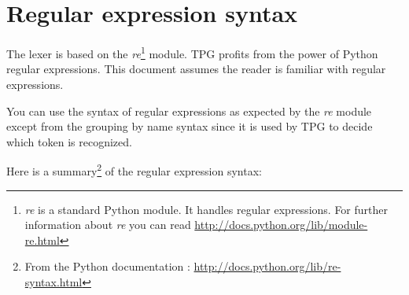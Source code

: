 \section{Regular expression syntax}

The lexer is based on the \emph{re}\footnote{\emph{re} is a standard Python module. It handles regular expressions. For further information about \emph{re} you can read \url{http://docs.python.org/lib/module-re.html}} module.
TPG profits from the power of Python regular expressions.
This document assumes the reader is familiar with regular expressions.

You can use the syntax of regular expressions as expected by the \emph{re} module except from the grouping by name syntax since it is used by TPG to decide which token is recognized.

Here is a summary\footnote{From the Python documentation : \url{http://docs.python.org/lib/re-syntax.html}} of the regular expression syntax:

